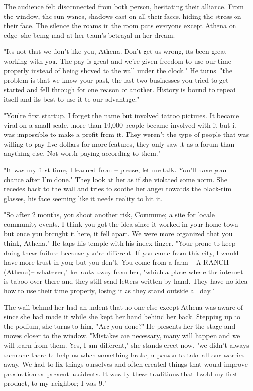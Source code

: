         The audience felt disconnected from both person, hesitating their alliance. From the window, the sun wanes, shadows cast on all their
    faces, hiding the stress on their face. The silence the roams in the room puts everyone except Athena on edge, she being mad at her team's
    betrayal in her dream.

        "Its not that we don't like you, Athena. Don't get us wrong, its been great working with you. The pay is great and we're given freedom
    to use our time properly instead of being shoved to the wall under the clock." He turns, "the problem is that we know your past, the last
    two businesses you tried to get started and fell through for one reason or another. History is bound to repeat itself and its best to
    use it to our advantage."

        "You're first startup, I forget the name but involved tattoo pictures. It became viral on a small scale, more than 10,000 people became
    involved with it but it was impossible to make a profit from it. They weren't the type of people that was willing to pay five dollars for
    more features, they only saw it as a forum than anything else. Not worth paying according to them."

        "It was my first time, I learned from -- please, let me talk. You'll have your chance after I'm done." They look at her as if she 
    violated some norm. She recedes back to the wall and tries to soothe her anger towards the black-rim glasses, his face seeming like it
    needs reality to hit it.

        "So after 2 months, you shoot another risk, Commune; a site for locale community events. I think you got the idea since it worked in
    your home town but once you brought it here, it fell apart. We were more organized that you think, Athena." He taps his temple with his 
    index finger. "Your prone to keep doing these failure because you're different. If you came from this city, I would have more trust in
    you; but you don't. You come from a farm -- A RANCH (Athena)-- whatever," he looks away from her, "which a place where the internet is
    taboo over there and they still send letters written by hand. They have no idea how to use their time properly, losing it as they stand
    outside all day."

        The wall behind her had an indent that no one else except Athena was aware of since she had made it while she kept her hand behind her 
    back. Stepping up to the podium, she turns to him, "Are you done?" He presents her the stage and moves closer to the window. "Mistakes are
    necessary, many will happen and we will learn from them. Yes, I am different," she stands erect now, "we didn't always someone there to
    help us when something broke, a person to take all our worries away. We had to fix things ourselves and often created things that would
    improve production or prevent accidents. It was by these traditions that I sold my first product, to my neighbor; I was 9."

